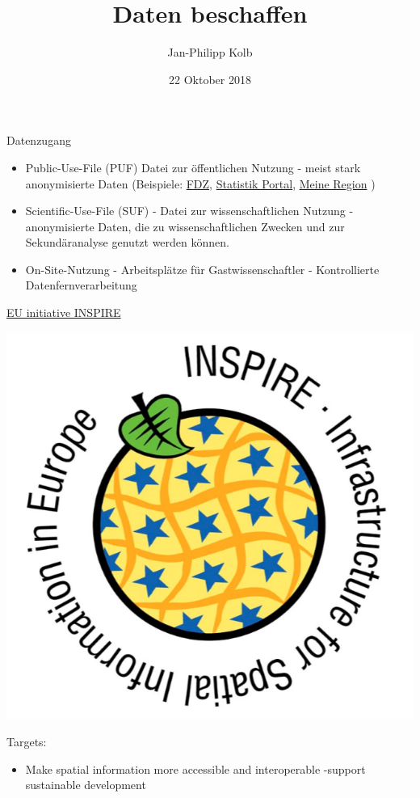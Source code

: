 \documentclass[ignorenonframetext,]{beamer}
\title{Daten beschaffen}
\author{Jan-Philipp Kolb}
\date{22 Oktober 2018}
\providecommand{\tightlist}{%
  \setlength{\itemsep}{0pt}\setlength{\parskip}{0pt}}
\begin{document}
\frame{\titlepage}

\begin{frame}{Datenzugang}

\begin{itemize}
\item
  Public-Use-File (PUF) Datei zur öffentlichen Nutzung - meist stark
  anonymisierte Daten (Beispiele:
  \href{www.forschungsdatenzentrum.de}{FDZ},
  \href{www.statistik-portal.de}{Statistik Portal},
  \href{www.infothek.statistik.rlp.de/lis/MeineRegion/index.asp}{Meine
  Region} )
\item
  Scientific-Use-File (SUF) - Datei zur wissenschaftlichen Nutzung -
  anonymisierte Daten, die zu wissenschaftlichen Zwecken und zur
  Sekundäranalyse genutzt werden können.
\item
  On-Site-Nutzung - Arbeitsplätze für Gastwissenschaftler -
  Kontrollierte Datenfernverarbeitung
\end{itemize}

\end{frame}

\begin{frame}{\href{http://inspire.ec.europa.eu/reports/Registration_form.pdf}{EU
initiative INSPIRE}}

\includegraphics{figure/logo_inspire.PNG}

\begin{block}{Targets:}

\begin{itemize}
\tightlist
\item
  Make spatial information more accessible and interoperable -support
  sustainable development
\end{itemize}

\end{block}

\end{frame}
\end{document}
